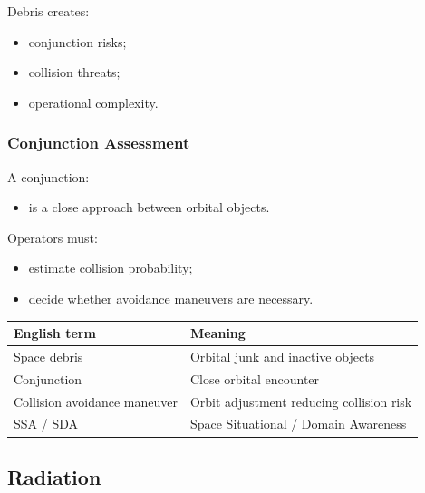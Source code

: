 \documentclass[10pt,a4paper,twocolumn]{article}
\begin{document}
Debris creates:
\begin{itemize}
    \item conjunction risks;
    \item collision threats;
    \item operational complexity.
\end{itemize}


\subsubsection*{Conjunction Assessment}

A conjunction:
\begin{itemize}
    \item is a close approach between orbital objects.
\end{itemize}

Operators must:
\begin{itemize}
    \item estimate collision probability;
    \item decide whether avoidance maneuvers are necessary.
\end{itemize}

\begin{vocabbox}
    \begin{tabularx}{\columnwidth}{lX}
        \toprule
        English term                 & Meaning                                  \\
        \midrule
        Space debris                 & Orbital junk and inactive objects        \\
        Conjunction                  & Close orbital encounter                  \\
        Collision avoidance maneuver & Orbit adjustment reducing collision risk \\
        SSA / SDA                    & Space Situational / Domain Awareness     \\
        \bottomrule
    \end{tabularx}
\end{vocabbox}


\subsection{Radiation}
\end{document}
